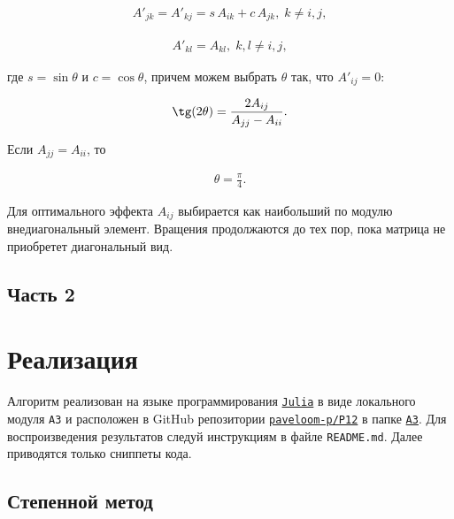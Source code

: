\begin{gather}
A'_{jk} = A'_{kj} = s \, A_{ik} + c \, A_{jk}, \; k \neq i, j,
\end{gather}

\begin{gather}
A'_{kl} = A_{kl}, \; k, l \neq i, j,
\end{gather}

где $ s = \sin \theta $ и $ c = \cos \theta $, причем можем выбрать $ \theta $ так, что $ A'_{ij} = 0 $:

\hs
\begin{gather}
\tg(2 \theta) = \frac{2 A_{ij}}{A_{jj} - A_{ii}}.
\end{gather}

Если $ A_{jj} = A_{ii} $, то

\hs
\begin{gather}
    \theta = \frac{\pi}{4}.
\end{gather}

Для оптимального эффекта $ A_{ij} $ выбирается как наибольший по модулю внедиагональный элемент. Вращения продолжаются до тех пор, пока матрица не приобретет диагональный вид.

\newpage

\subsection*{Часть 2}
\section*{Реализация}

\vspace{18pt}

Алгоритм реализован на языке программирования \href{https://julialang.org}{\footnotesize \texttt{Julia}} в виде локального модуля {\footnotesize \texttt{A3}} и расположен в GitHub репозитории \href{https://github.com/paveloom-p/P12}{\footnotesize \texttt{paveloom-p/P12}} в папке \href{https://github.com/paveloom-p/P12/tree/master/A3}{\footnotesize \texttt{A3}}. Для воспроизведения результатов следуй инструкциям в файле {\footnotesize \texttt{README.md}}. Далее приводятся только сниппеты кода.

\subsection{Степенной метод}

